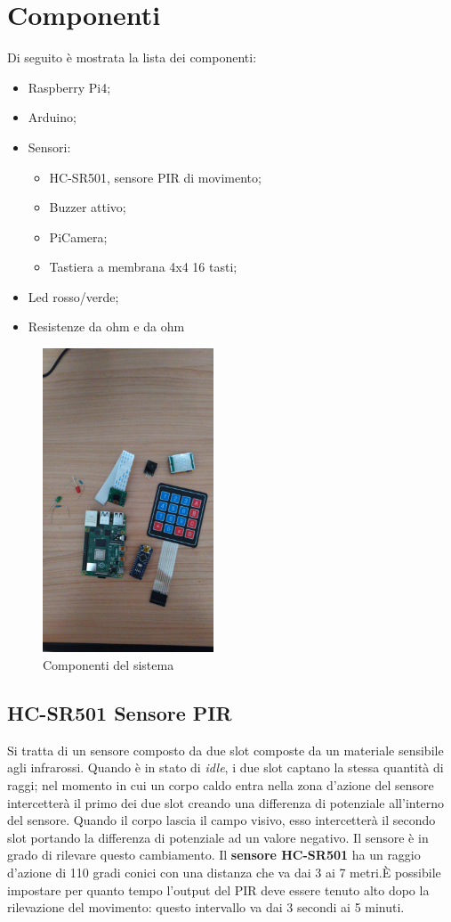 \documentclass[12pt]{article}
\begin{document}
	\section{Componenti}
	Di seguito è mostrata la lista dei componenti:
	\begin{itemize}
		\item Raspberry Pi4;
		\item Arduino;
		\item Sensori:	
		\begin{itemize}
			\item HC-SR501, sensore PIR di movimento;
			\item Buzzer attivo;
			\item PiCamera;
			\item Tastiera a membrana 4x4 16 tasti;
		\end{itemize}
		\item Led rosso/verde;
		\item Resistenze da ohm e da ohm
	\end{itemize}
	
	\begin{figure}[h]
		\centering
		\includegraphics[width=2.0in]{componenti}
		\caption{Componenti del sistema}
	\end{figure}

	\subsection{HC-SR501 Sensore PIR}
	Si tratta di un sensore composto da due slot composte da un materiale sensibile agli infrarossi.
	Quando è in stato di \textit{idle}, i due slot captano la stessa quantità di raggi; 
	nel momento in cui un corpo caldo entra nella zona d'azione del sensore intercetterà il primo 
	dei due slot creando una differenza di potenziale all'interno del sensore. Quando il corpo lascia
	il campo visivo, esso intercetterà il secondo slot portando la differenza di potenziale ad un 
	valore negativo. Il sensore è in grado di rilevare questo cambiamento. Il 
	\textbf{sensore HC-SR501} ha un raggio d'azione di 110 gradi conici con una distanza che va dai 
	3 ai 7 metri.È possibile impostare per quanto tempo l'output del PIR deve essere tenuto alto dopo 
	la rilevazione del movimento: questo intervallo va dai 3 secondi ai 5 minuti.
\end{document}
